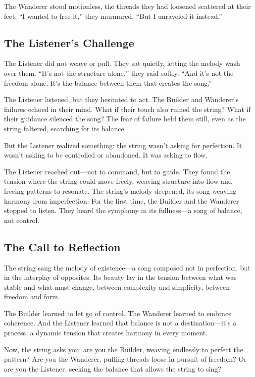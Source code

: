 \documentclass[12pt]{article}
\begin{document}
The Wanderer stood motionless, the threads they had loosened scattered at their feet. “I wanted to free it,” they murmured. “But I unraveled it instead.”

\subsection*{The Listener’s Challenge}
The Listener did not weave or pull. They sat quietly, letting the melody wash over them. “It’s not the structure alone,” they said softly. “And it’s not the freedom alone. It’s the balance between them that creates the song.”

The Listener listened, but they hesitated to act. The Builder and Wanderer’s failures echoed in their mind. What if their touch also ruined the string? What if their guidance silenced the song? The fear of failure held them still, even as the string faltered, searching for its balance.

But the Listener realized something: the string wasn’t asking for perfection. It wasn’t asking to be controlled or abandoned. It was asking to flow.

The Listener reached out---not to command, but to guide. They found the tension where the string could move freely, weaving structure into flow and freeing patterns to resonate. The string’s melody deepened, its song weaving harmony from imperfection. For the first time, the Builder and the Wanderer stopped to listen. They heard the symphony in its fullness---a song of balance, not control.

\subsection*{The Call to Reflection}
The string sang the melody of existence---a song composed not in perfection, but in the interplay of opposites. Its beauty lay in the tension between what was stable and what must change, between complexity and simplicity, between freedom and form. 

The Builder learned to let go of control. The Wanderer learned to embrace coherence. And the Listener learned that balance is not a destination---it’s a process, a dynamic tension that creates harmony in every moment.

Now, the string asks you: are you the Builder, weaving endlessly to perfect the pattern? Are you the Wanderer, pulling threads loose in pursuit of freedom? Or are you the Listener, seeking the balance that allows the string to sing?
\end{document}
